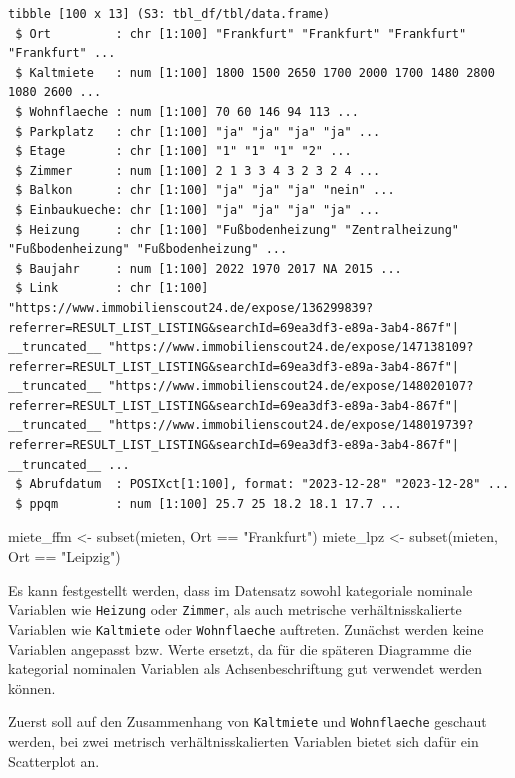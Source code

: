 \documentclass[
  a4paper,
  DIV=11]{scrartcl}
\newenvironment{Shaded}{\begin{snugshade}}{\end{snugshade}}
\newcommand{\FunctionTok}[1]{\textcolor[rgb]{0.28,0.35,0.67}{#1}}
\newcommand{\NormalTok}[1]{\textcolor[rgb]{0.00,0.23,0.31}{#1}}
\newcommand{\OtherTok}[1]{\textcolor[rgb]{0.00,0.23,0.31}{#1}}
\newcommand{\SpecialCharTok}[1]{\textcolor[rgb]{0.37,0.37,0.37}{#1}}
\newcommand{\StringTok}[1]{\textcolor[rgb]{0.13,0.47,0.30}{#1}}
\begin{document}
\begin{verbatim}
tibble [100 x 13] (S3: tbl_df/tbl/data.frame)
 $ Ort         : chr [1:100] "Frankfurt" "Frankfurt" "Frankfurt" "Frankfurt" ...
 $ Kaltmiete   : num [1:100] 1800 1500 2650 1700 2000 1700 1480 2800 1080 2600 ...
 $ Wohnflaeche : num [1:100] 70 60 146 94 113 ...
 $ Parkplatz   : chr [1:100] "ja" "ja" "ja" "ja" ...
 $ Etage       : chr [1:100] "1" "1" "1" "2" ...
 $ Zimmer      : num [1:100] 2 1 3 3 4 3 2 3 2 4 ...
 $ Balkon      : chr [1:100] "ja" "ja" "ja" "nein" ...
 $ Einbaukueche: chr [1:100] "ja" "ja" "ja" "ja" ...
 $ Heizung     : chr [1:100] "Fußbodenheizung" "Zentralheizung" "Fußbodenheizung" "Fußbodenheizung" ...
 $ Baujahr     : num [1:100] 2022 1970 2017 NA 2015 ...
 $ Link        : chr [1:100] "https://www.immobilienscout24.de/expose/136299839?referrer=RESULT_LIST_LISTING&searchId=69ea3df3-e89a-3ab4-867f"| __truncated__ "https://www.immobilienscout24.de/expose/147138109?referrer=RESULT_LIST_LISTING&searchId=69ea3df3-e89a-3ab4-867f"| __truncated__ "https://www.immobilienscout24.de/expose/148020107?referrer=RESULT_LIST_LISTING&searchId=69ea3df3-e89a-3ab4-867f"| __truncated__ "https://www.immobilienscout24.de/expose/148019739?referrer=RESULT_LIST_LISTING&searchId=69ea3df3-e89a-3ab4-867f"| __truncated__ ...
 $ Abrufdatum  : POSIXct[1:100], format: "2023-12-28" "2023-12-28" ...
 $ ppqm        : num [1:100] 25.7 25 18.2 18.1 17.7 ...
\end{verbatim}

\begin{Shaded}
\begin{Highlighting}[]
\NormalTok{miete\_ffm }\OtherTok{\textless{}{-}} \FunctionTok{subset}\NormalTok{(mieten, Ort }\SpecialCharTok{==} \StringTok{"Frankfurt"}\NormalTok{)}
\NormalTok{miete\_lpz }\OtherTok{\textless{}{-}} \FunctionTok{subset}\NormalTok{(mieten, Ort }\SpecialCharTok{==} \StringTok{"Leipzig"}\NormalTok{)}
\end{Highlighting}
\end{Shaded}

Es kann festgestellt werden, dass im Datensatz sowohl kategoriale
nominale Variablen wie \texttt{Heizung} oder \texttt{Zimmer}, als auch
metrische verhältnisskalierte Variablen wie \texttt{Kaltmiete} oder
\texttt{Wohnflaeche} auftreten. Zunächst werden keine Variablen
angepasst bzw. Werte ersetzt, da für die späteren Diagramme die
kategorial nominalen Variablen als Achsenbeschriftung gut verwendet
werden können.

Zuerst soll auf den Zusammenhang von \texttt{Kaltmiete} und
\texttt{Wohnflaeche} geschaut werden, bei zwei metrisch
verhältnisskalierten Variablen bietet sich dafür ein Scatterplot an.
\end{document}
